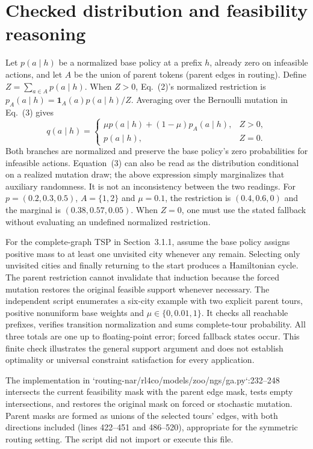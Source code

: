 \documentclass[10pt]{article}
\begin{document}
\section*{Checked distribution and feasibility reasoning}
Let \(p(a\mid h)\) be a normalized base policy at a prefix \(h\), already zero on infeasible actions, and let \(A\) be the union of parent tokens (parent edges in routing). Define \(Z=\sum_{a\in A}p(a\mid h)\). When \(Z>0\), Eq. (2)’s normalized restriction is \(p_A(a\mid h)=\mathbf1_A(a)p(a\mid h)/Z\). Averaging over the Bernoulli mutation in Eq. (3) gives \[q(a\mid h)=\begin{cases}
\mu p(a\mid h)+(1-\mu)p_A(a\mid h),&Z>0,\\
p(a\mid h),&Z=0.
\end{cases}\] Both branches are normalized and preserve the base policy’s zero probabilities for infeasible actions. Equation (3) can also be read as the distribution conditional on a realized mutation draw; the above expression simply marginalizes that auxiliary randomness. It is not an inconsistency between the two readings. For \(p=(0.2,0.3,0.5)\), \(A=\{1,2\}\) and \(\mu=0.1\), the restriction is \((0.4,0.6,0)\) and the marginal is \((0.38,0.57,0.05)\). When \(Z=0\), one must use the stated fallback without evaluating an undefined normalized restriction.\par
For the complete-graph TSP in Section 3.1.1, assume the base policy assigns positive mass to at least one unvisited city whenever any remain. Selecting only unvisited cities and finally returning to the start produces a Hamiltonian cycle. The parent restriction cannot invalidate that induction because the forced mutation restores the original feasible support whenever necessary. The independent script enumerates a six-city example with two explicit parent tours, positive nonuniform base weights and \(\mu\in\{0,0.01,1\}\). It checks all reachable prefixes, verifies transition normalization and sums complete-tour probability. All three totals are one up to floating-point error; forced fallback states occur. This finite check illustrates the general support argument and does not establish optimality or universal constraint satisfaction for every application.\par
The implementation in `routing-nar/rl4co/models/zoo/ngs/ga.py`:232–248 intersects the current feasibility mask with the parent edge mask, tests empty intersections, and restores the original mask on forced or stochastic mutation. Parent masks are formed as unions of the selected tours’ edges, with both directions included (lines 422–451 and 486–520), appropriate for the symmetric routing setting. The script did not import or execute this file.\par
\end{document}
